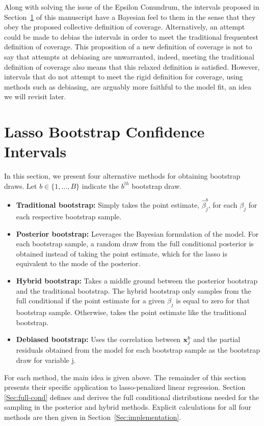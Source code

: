 Along with solving the issue of the Epsilon Conundrum, the intervals proposed in Section~\ref{Sec:methods} of this manuscript have a Bayesian feel to them in the sense that they obey the proposed collective definition of coverage. Alternatively, an attempt could be made to debias the intervals in order to meet the traditional frequentest definition of coverage. This proposition of a new definition of coverage is not to say that attempts at debiasing are unwarranted, indeed, meeting the traditional definition of coverage also means that this relaxed definition is satisfied. However, intervals that do not attempt to meet the rigid definition for coverage, using methods such as debiasing, are arguably more faithful to the model fit, an idea we will revisit later. 


\section{Lasso Bootstrap Confidence Intervals}\label{Sec:methods}

In this section, we present four alternative methods for obtaining bootstrap draws. Let $b \in \lbrace 1, \ldots, B \rbrace$ indicate the $b^{th}$ bootstrap draw.

\begin{itemize}
\item \textbf{Traditional bootstrap:} Simply takes the point estimate, $\hat{\beta}_j^b$,  for each $\beta_j$ for each respective bootstrap sample.
\item \textbf{Posterior bootstrap:} Leverages the Bayesian formulation of the model. For each bootstrap sample, a random draw from the full conditional posterior is obtained instead of taking the point estimate, which for the lasso is equivalent to the mode of the posterior.
\item \textbf{Hybrid bootstrap:} Takes a middle ground between the posterior bootstrap and the traditional bootstrap. The hybrid bootstrap only samples from the full conditional if the point estimate for a given $\beta_j$ is equal to zero for that bootstrap sample. Otherwise, takes the point estimate like the traditional bootstrap.
\item \textbf{Debiased bootstrap:} Uses the correlation between $\boldsymbol{\mathbf{x}}^b_j$ and the partial residuals obtained from the model for each bootstrap sample as the bootstrap draw for variable j.
\end{itemize}

For each method, the main idea is given above. The remainder of this section presents their specific application to lasso-penalized linear regression. Section \ref{Sec:full-cond} defines and derives the full conditional distributions needed for the sampling in the posterior and hybrid methods. Explicit calculations for all four methods are then given in Section~\ref{Sec:implementation}.

